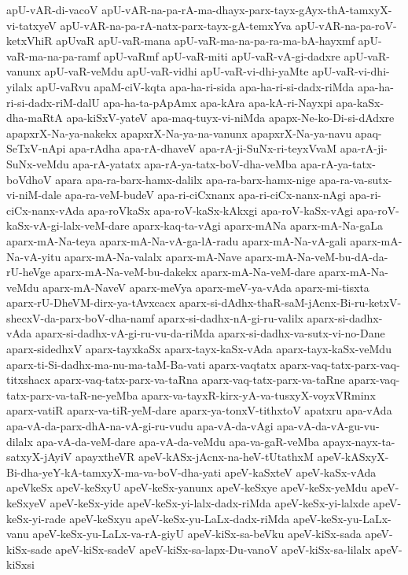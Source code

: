 {apU-vAR-di-vacoV
apU-vAR-na-pa-rA-ma-dhayx-parx-tayx-gAyx-thA-tamxyX-vi-tatxyeV
apU-vAR-na-pa-rA-natx-parx-tayx-gA-temxYva
apU-vAR-na-pa-roV-ketxVhiR
apUvaR
apU-vaR-mana
apU-vaR-ma-na-pa-ra-ma-bA-hayxmf
apU-vaR-ma-na-pa-ramf
apU-vaRmf
apU-vaR-miti
apU-vaR-vA-gi-dadxre
apU-vaR-vanunx
apU-vaR-veMdu
apU-vaR-vidhi
apU-vaR-vi-dhi-yaMte
apU-vaR-vi-dhi-yilalx
apU-vaRvu
apaM-ciV-kqta
apa-ha-ri-sida
apa-ha-ri-si-dadx-riMda
apa-ha-ri-si-dadx-riM-dalU
apa-ha-ta-pApAmx
apa-kAra
apa-kA-ri-Nayxpi
apa-kaSx-dha-maRtA
apa-kiSxV-yateV
apa-maq-tuyx-vi-niMda
apapx-Ne-ko-Di-si-dAdxre
apapxrX-Na-ya-nakekx
apapxrX-Na-ya-na-vanunx
apapxrX-Na-ya-navu
apaq-SeTxV-nApi
apa-rAdha
apa-rA-dhaveV
apa-rA-ji-SuNx-ri-teyxVvaM
apa-rA-ji-SuNx-veMdu
apa-rA-yatatx
apa-rA-ya-tatx-boV-dha-veMba
apa-rA-ya-tatx-boVdhoV
apara
apa-ra-barx-hamx-dalilx
apa-ra-barx-hamx-nige
apa-ra-va-sutx-vi-niM-dale
apa-ra-veM-budeV
apa-ri-ciCxnanx
apa-ri-ciCx-nanx-nAgi
apa-ri-ciCx-nanx-vAda
apa-roVkaSx
apa-roV-kaSx-kAkxgi
apa-roV-kaSx-vAgi
apa-roV-kaSx-vA-gi-lalx-veM-dare
aparx-kaq-ta-vAgi
aparx-mANa
aparx-mA-Na-gaLa
aparx-mA-Na-teya
aparx-mA-Na-vA-ga-lA-radu
aparx-mA-Na-vA-gali
aparx-mA-Na-vA-yitu
aparx-mA-Na-valalx
aparx-mA-Nave
aparx-mA-Na-veM-bu-dA-da-rU-heVge
aparx-mA-Na-veM-bu-dakekx
aparx-mA-Na-veM-dare
aparx-mA-Na-veMdu
aparx-mA-NaveV
aparx-meVya
aparx-meV-ya-vAda
aparx-mi-tisxta
aparx-rU-DheVM-dirx-ya-tAvxcacx
aparx-si-dAdhx-thaR-saM-jAcnx-Bi-ru-ketxV-shecxV-da-parx-boV-dha-namf
aparx-si-dadhx-nA-gi-ru-valilx
aparx-si-dadhx-vAda
aparx-si-dadhx-vA-gi-ru-vu-da-riMda
aparx-si-dadhx-va-sutx-vi-no-Dane
aparx-sidedhxV
aparx-tayxkaSx
aparx-tayx-kaSx-vAda
aparx-tayx-kaSx-veMdu
aparx-ti-Si-dadhx-ma-nu-ma-taM-Ba-vati
aparx-vaqtatx
aparx-vaq-tatx-parx-vaq-titxshacx
aparx-vaq-tatx-parx-va-taRna
aparx-vaq-tatx-parx-va-taRne
aparx-vaq-tatx-parx-va-taR-ne-yeMba
aparx-va-tayxR-kirx-yA-va-tusxyX-voyxVRminx
aparx-vatiR
aparx-va-tiR-yeM-dare
aparx-ya-tonxV-tithxtoV
apatxru
apa-vAda
apa-vA-da-parx-dhA-na-vA-gi-ru-vudu
apa-vA-da-vAgi
apa-vA-da-vA-gu-vu-dilalx
apa-vA-da-veM-dare
apa-vA-da-veMdu
apa-va-gaR-veMba
apayx-nayx-ta-satxyX-jAyiV
apayxtheVR
apeV-kASx-jAcnx-na-heV-tUtathxM
apeV-kASxyX-Bi-dha-yeY-kA-tamxyX-ma-va-boV-dha-yati
apeV-kaSxteV
apeV-kaSx-vAda
apeVkeSx
apeV-keSxyU
apeV-keSx-yanunx
apeV-keSxye
apeV-keSx-yeMdu
apeV-keSxyeV
apeV-keSx-yide
apeV-keSx-yi-lalx-dadx-riMda
apeV-keSx-yi-lalxde
apeV-keSx-yi-rade
apeV-keSxyu
apeV-keSx-yu-LaLx-dadx-riMda
apeV-keSx-yu-LaLx-vanu
apeV-keSx-yu-LaLx-va-rA-giyU
apeV-kiSx-sa-beVku
apeV-kiSx-sada
apeV-kiSx-sade
apeV-kiSx-sadeV
apeV-kiSx-sa-lapx-Du-vanoV
apeV-kiSx-sa-lilalx
apeV-kiSxsi
}
